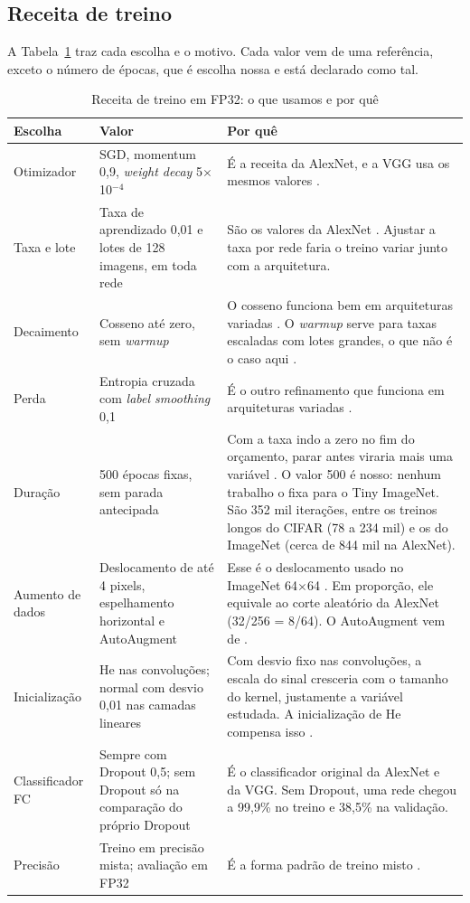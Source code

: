 \documentclass[conference]{IEEEtran}
\newcommand{\by}{\ensuremath{\times}}
\begin{document}
\subsection{Receita de treino}
\label{sec:receita}

A Tabela~\ref{tab:receita} traz cada escolha e o motivo. Cada valor vem de uma referência, exceto o número de épocas, que é escolha nossa e está declarado como tal.

\begin{table}[!t]
\caption{Receita de treino em FP32: o que usamos e por quê}
\label{tab:receita}
\centering
\footnotesize
\begin{tabular}{@{}p{}p{}p{}@{}}
\toprule
\textbf{Escolha} & \textbf{Valor} & \textbf{Por quê} \\
\midrule
Otimizador & SGD, momentum 0,9, \textit{weight decay} 5$\times$10$^{-4}$ & É a receita da AlexNet, e a VGG usa os mesmos valores \cite{krizhevsky2012imagenet,simonyan2015very}. \\
Taxa e lote & Taxa de aprendizado 0,01 e lotes de 128 imagens, em toda rede & São os valores da AlexNet \cite{krizhevsky2012imagenet}. Ajustar a taxa por rede faria o treino variar junto com a arquitetura. \\
Decaimento & Cosseno até zero, sem \textit{warmup} & O cosseno funciona bem em arquiteturas variadas \cite{he2019bag}. O \textit{warmup} serve para taxas escaladas com lotes grandes, o que não é o caso aqui \cite{goyal2017accurate}. \\
Perda & Entropia cruzada com \textit{label smoothing} 0,1 & É o outro refinamento que funciona em arquiteturas variadas \cite{szegedy2016rethinking,he2019bag}. \\
Duração & 500 épocas fixas, sem parada antecipada & Com a taxa indo a zero no fim do orçamento, parar antes viraria mais uma variável \cite{li2020budgeted}. O valor 500 é nosso: nenhum trabalho o fixa para o Tiny ImageNet. São 352 mil iterações, entre os treinos longos do CIFAR (78 a 234 mil) e os do ImageNet (cerca de 844 mil na AlexNet). \\
Aumento de dados & Deslocamento de até 4 pixels, espelhamento horizontal e AutoAugment & Esse é o deslocamento usado no ImageNet 64\by64 \cite{chrabaszcz2017downsampled}. Em proporção, ele equivale ao corte aleatório da AlexNet (32/256 = 8/64). O AutoAugment vem de \cite{cubuk2019autoaugment}. \\
Inicialização & He nas convoluções; normal com desvio 0,01 nas camadas lineares & Com desvio fixo nas convoluções, a escala do sinal cresceria com o tamanho do kernel, justamente a variável estudada. A inicialização de He compensa isso \cite{he2015delving}. \\
Classificador FC & Sempre com Dropout 0,5; sem Dropout só na comparação do próprio Dropout & É o classificador original da AlexNet e da VGG. Sem Dropout, uma rede chegou a 99,9\% no treino e 38,5\% na validação. \\
Precisão & Treino em precisão mista; avaliação em FP32 & É a forma padrão de treino misto \cite{micikevicius2018mixed}. \\
\bottomrule
\end{tabular}
\end{table}
\end{document}

